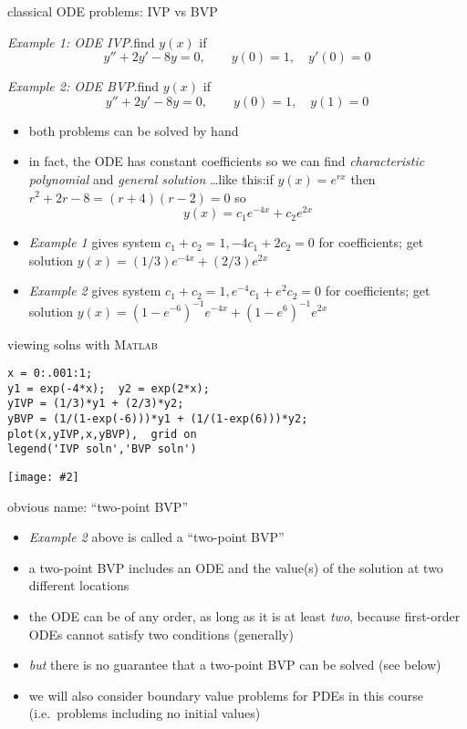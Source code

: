 \documentclass[10pt,hyperref]{beamer}
\newcommand{\Matlab}{\textsc{Matlab}\xspace}
\newcommand{\centerimage}[2]{\begin{center}
\texttt{[image: \#2]}
\end{center}}
\begin{document}
\begin{frame}{classical ODE problems: IVP vs BVP}

\small
\noindent\emph{Example 1: ODE IVP}.\qquad find $y(x)$ if
  	$$y'' + 2 y' - 8 y = 0, \qquad y(0)=1, \quad y'(0)=0$$

\noindent\emph{Example 2: ODE BVP}.\qquad find $y(x)$ if
  	$$y'' + 2 y' - 8 y = 0, \qquad y(0)=1, \quad y(1)=0$$
\normalsize

  \begin{itemize}
  \item \alert{both problems can be solved by hand}
  \item in fact, the ODE has constant coefficients so we can find \emph{characteristic polynomial} and \emph{general solution} \dots like this:\quad  if $y(x)=e^{rx}$ then $r^2 + 2 r - 8 = (r+4)(r-2) = 0$ so 
  $$y(x) = c_1 e^{-4x} + c_2 e^{2x}$$
  \item \emph{Example 1} gives system $c_1+c_2=1,-4c_1+2c_2=0$ for coefficients; get solution $y(x)=(1/3)e^{-4x}+(2/3)e^{2x}$  %
  \item \emph{Example 2} gives system $c_1+c_2=1,e^{-4} c_1+ e^2 c_2=0$ for coefficients; get solution $y(x)=(1-e^{-6})^{-1} e^{-4 x} + (1-e^6)^{-1} e^{2x}$
  \end{itemize}
\end{frame}


\begin{frame}[fragile]{viewing solns with \Matlab} 
\small
\begin{verbatim}
x = 0:.001:1;
y1 = exp(-4*x);  y2 = exp(2*x);
yIVP = (1/3)*y1 + (2/3)*y2;
yBVP = (1/(1-exp(-6)))*y1 + (1/(1-exp(6)))*y2;
plot(x,yIVP,x,yBVP),  grid on
legend('IVP soln','BVP soln')
\end{verbatim}

\centerimage{0.6}{ivpbvp-crop}
\end{frame}


\begin{frame}{obvious name: ``two-point BVP''} 


\normalsize

\begin{itemize}
\item \emph{Example 2} above is called a ``two-point BVP''
\item a two-point BVP includes an ODE and the value(s) of the solution at two different locations
\item the ODE can be of any order, as long as it is at least \emph{two}, because first-order ODEs cannot satisfy two conditions (generally)
\item \emph{but} there is no guarantee that a two-point BVP can be solved (see below)
\item we will also consider boundary value problems for PDEs in this course (i.e.~problems including no initial values)
\end{itemize}
\end{frame}
\end{document}
